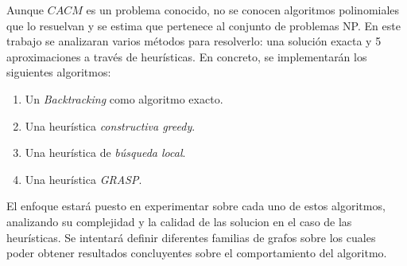 
Aunque $CACM$ es un problema conocido, no se conocen algoritmos polinomiales que lo resuelvan y se estima que pertenece al conjunto de problemas NP. En este trabajo se analizaran varios métodos para resolverlo: una soluci\'on exacta y 5 aproximaciones a trav\'es de heur\'isticas. En concreto, se implementarán los siguientes algoritmos:

\begin{enumerate}
\item Un \textit{Backtracking} como algoritmo exacto.
\item Una heur\'istica \textit{constructiva greedy}.
\item Una heur\'istica de \textit{b\'usqueda local}.
\item Una heur\'istica \textit{GRASP}.
\end{enumerate}

El enfoque estará puesto en experimentar sobre cada uno de estos algoritmos, analizando su complejidad y la calidad de las solucion en el caso de las heur\'isticas.
Se intentará definir diferentes familias de grafos sobre los cuales poder obtener resultados concluyentes sobre el comportamiento del algoritmo.
